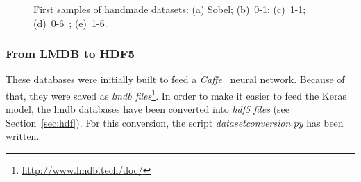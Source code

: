 \begin{figure}
\begin{subfigure}{0.5\textwidth}
		\caption{}
	\end{subfigure}
	\caption{First samples of handmade datasets: (a) Sobel; (b)~0-1; (c)~1-1; (d)~0-6~; (e)~1-6.}
	\label{fig:aug_nuria}
\end{figure}

\subsubsection{From LMDB to HDF5} \label{subsubsec:lmdb2hdf5}
These databases were initially built to feed a \emph{Caffe}~\cite{jia2014caffe} neural network. Because of that, they were saved as \emph{\gls{lmdb} files}\footnote{\url{http://www.lmdb.tech/doc/}}. In order to make it easier to feed the Keras model, the \gls{lmdb} databases have been converted into \emph{\gls{hdf5} files} (see Section~\ref{sec:hdf}). For this conversion, the script \emph{\textit{datasetconversion.py}} has been written.

